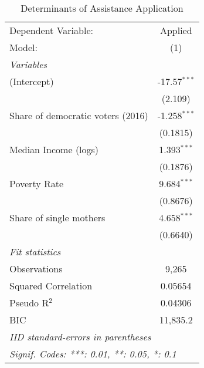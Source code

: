 
\begin{table}[htbp]
   \centering
   \caption{\label{ResultsLogit} Determinants of Assistance Application}
   \begin{tabular}{lc}
      \tabularnewline\midrule\midrule
      Dependent Variable:               & Applied\\
      Model:                            & (1)\\
      \midrule \emph{Variables} &  \\
      (Intercept)                       & -17.57$^{***}$\\
                                        & (2.109)\\
      Share of democratic voters (2016) & -1.258$^{***}$\\
                                        & (0.1815)\\
      Median Income (logs)              & 1.393$^{***}$\\
                                        & (0.1876)\\
      Poverty Rate                      & 9.684$^{***}$\\
                                        & (0.8676)\\
      Share of single mothers           & 4.658$^{***}$\\
                                        & (0.6640)\\
      \midrule \emph{Fit statistics} &  \\
      Observations                      & 9,265\\
      Squared Correlation               & 0.05654\\
      Pseudo R$^2$                      & 0.04306\\
      BIC                               & 11,835.2\\
      \midrule\midrule\multicolumn{2}{l}{\emph{IID standard-errors in parentheses}}\\
      \multicolumn{2}{l}{\emph{Signif. Codes: ***: 0.01, **: 0.05, *: 0.1}}\\
   \end{tabular}
\end{table}


